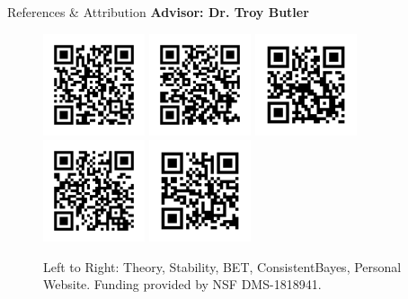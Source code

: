   \begin{block}{References \& Attribution}
    \centering
    \textbf{Advisor: Dr. Troy Butler}
    \begin{figure}
        \includegraphics[width=3cm]{ref-theory}
        \includegraphics[width=3cm]{ref-stability}
        \includegraphics[width=3cm]{ref-bet}
        \includegraphics[width=3cm]{ref-cb}
        \includegraphics[width=3cm]{ref-website}
    \caption*{\centering Left to Right: Theory, Stability, BET, ConsistentBayes, Personal Website. \newline Funding provided by NSF DMS-1818941.}
    \end{figure}
   

  

  \end{block}


